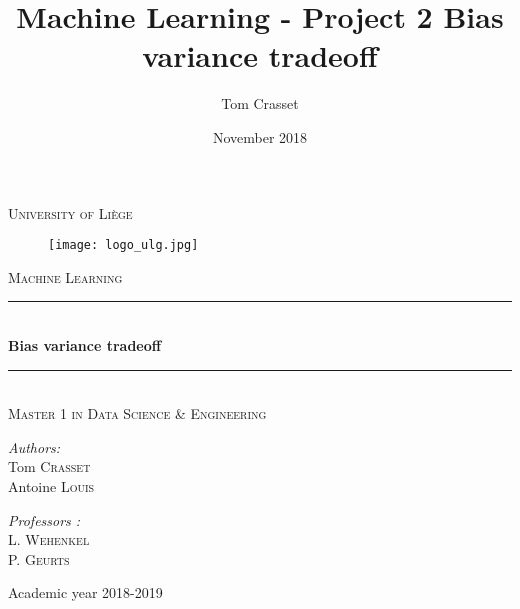 \documentclass{article}
\title{Machine Learning - Project 2 Bias variance tradeoff}
\author{Tom Crasset}
\date{November 2018}
\newcommand{\HRule}{\rule{\linewidth}{0.5mm}}
\begin{document}
 
\begin{titlepage}


  \begin{sffamily}
  \begin{center}

   
    \textsc{\Large University of Liège}\\[0.8cm]
    
    \begin{figure}[h!]
		\begin{center}
		\texttt{[image: logo\_ulg.jpg]}\\[1cm]
		\end{center}
	\end{figure}
	

    \textsc{\Large Machine Learning}\\[1.1cm]

    
    \HRule \\[0.4cm]
    { \LARGE \bfseries Bias variance tradeoff\\[0.4cm] }

    \HRule \\[0.5cm]
    
    \textsc{Master 1 in Data Science \& Engineering} \\[2.5cm]

   \begin{minipage}{0.4\textwidth}
      \begin{flushleft} \large
        \emph{Authors:}\\
        Tom \textsc{Crasset}\\
        Antoine \textsc{Louis} 
      \end{flushleft}
    \end{minipage}
    \begin{minipage}{0.4\textwidth}
      \begin{flushright} \large
        \emph{Professors :}\\
        L. \textsc{Wehenkel}\\
        P. \textsc{Geurts}\\

      \end{flushright}
    \end{minipage}
    


    \vfill

    
    {\large Academic year 2018-2019}

  \end{center}
  \end{sffamily}
\end{titlepage}
\end{document}
